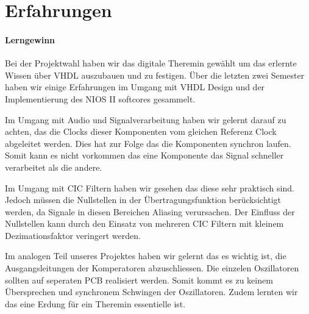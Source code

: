 \clearpage
\section{Erfahrungen}\label{sec:Erfahrungen}


\paragraph{Lerngewinn}
Bei der Projektwahl haben wir das digitale Theremin gewählt um das erlernte Wissen über VHDL auszubauen und zu festigen. Über die letzten zwei Semester haben wir einige Erfahrungen im Umgang mit VHDL Design und der Implementierung des NIOS II softcores gesammelt.

Im Umgang mit Audio und Signalverarbeitung haben wir gelernt darauf zu achten, das die Clocks dieser Komponenten vom gleichen Referenz Clock abgeleitet werden. Dies hat zur Folge das die Komponenten synchron laufen. Somit kann es nicht vorkommen das eine Komponente das Signal schneller verarbeitet als die andere. 

Im Umgang mit CIC Filtern haben wir gesehen das diese sehr praktisch sind. Jedoch müssen die Nullstellen in der Übertragungsfunktion berücksichtigt werden, da Signale in diesen Bereichen Aliasing verursachen. Der Einfluss der Nullstellen kann durch den Einsatz von mehreren CIC Filtern mit kleinem Dezimationsfaktor veringert werden.

Im analogen Teil unseres Projektes haben wir gelernt das es wichtig ist, die Ausgangsleitungen der Komperatoren abzuschliessen. Die einzelen Oszillatoren sollten auf seperaten PCB realisiert werden. Somit kommt es zu keinem Übersprechen und synchronem Schwingen der Oszillatoren.  Zudem lernten wir das eine Erdung für ein Theremin essentielle ist.







